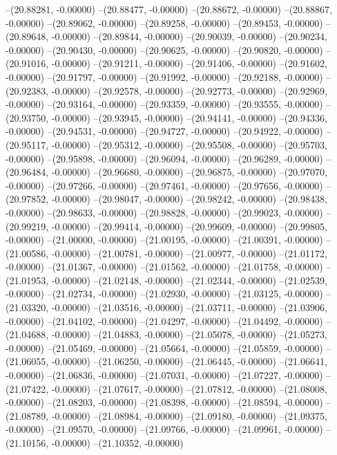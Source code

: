 --(20.88281, -0.00000)
--(20.88477, -0.00000)
--(20.88672, -0.00000)
--(20.88867, -0.00000)
--(20.89062, -0.00000)
--(20.89258, -0.00000)
--(20.89453, -0.00000)
--(20.89648, -0.00000)
--(20.89844, -0.00000)
--(20.90039, -0.00000)
--(20.90234, -0.00000)
--(20.90430, -0.00000)
--(20.90625, -0.00000)
--(20.90820, -0.00000)
--(20.91016, -0.00000)
--(20.91211, -0.00000)
--(20.91406, -0.00000)
--(20.91602, -0.00000)
--(20.91797, -0.00000)
--(20.91992, -0.00000)
--(20.92188, -0.00000)
--(20.92383, -0.00000)
--(20.92578, -0.00000)
--(20.92773, -0.00000)
--(20.92969, -0.00000)
--(20.93164, -0.00000)
--(20.93359, -0.00000)
--(20.93555, -0.00000)
--(20.93750, -0.00000)
--(20.93945, -0.00000)
--(20.94141, -0.00000)
--(20.94336, -0.00000)
--(20.94531, -0.00000)
--(20.94727, -0.00000)
--(20.94922, -0.00000)
--(20.95117, -0.00000)
--(20.95312, -0.00000)
--(20.95508, -0.00000)
--(20.95703, -0.00000)
--(20.95898, -0.00000)
--(20.96094, -0.00000)
--(20.96289, -0.00000)
--(20.96484, -0.00000)
--(20.96680, -0.00000)
--(20.96875, -0.00000)
--(20.97070, -0.00000)
--(20.97266, -0.00000)
--(20.97461, -0.00000)
--(20.97656, -0.00000)
--(20.97852, -0.00000)
--(20.98047, -0.00000)
--(20.98242, -0.00000)
--(20.98438, -0.00000)
--(20.98633, -0.00000)
--(20.98828, -0.00000)
--(20.99023, -0.00000)
--(20.99219, -0.00000)
--(20.99414, -0.00000)
--(20.99609, -0.00000)
--(20.99805, -0.00000)
--(21.00000, -0.00000)
--(21.00195, -0.00000)
--(21.00391, -0.00000)
--(21.00586, -0.00000)
--(21.00781, -0.00000)
--(21.00977, -0.00000)
--(21.01172, -0.00000)
--(21.01367, -0.00000)
--(21.01562, -0.00000)
--(21.01758, -0.00000)
--(21.01953, -0.00000)
--(21.02148, -0.00000)
--(21.02344, -0.00000)
--(21.02539, -0.00000)
--(21.02734, -0.00000)
--(21.02930, -0.00000)
--(21.03125, -0.00000)
--(21.03320, -0.00000)
--(21.03516, -0.00000)
--(21.03711, -0.00000)
--(21.03906, -0.00000)
--(21.04102, -0.00000)
--(21.04297, -0.00000)
--(21.04492, -0.00000)
--(21.04688, -0.00000)
--(21.04883, -0.00000)
--(21.05078, -0.00000)
--(21.05273, -0.00000)
--(21.05469, -0.00000)
--(21.05664, -0.00000)
--(21.05859, -0.00000)
--(21.06055, -0.00000)
--(21.06250, -0.00000)
--(21.06445, -0.00000)
--(21.06641, -0.00000)
--(21.06836, -0.00000)
--(21.07031, -0.00000)
--(21.07227, -0.00000)
--(21.07422, -0.00000)
--(21.07617, -0.00000)
--(21.07812, -0.00000)
--(21.08008, -0.00000)
--(21.08203, -0.00000)
--(21.08398, -0.00000)
--(21.08594, -0.00000)
--(21.08789, -0.00000)
--(21.08984, -0.00000)
--(21.09180, -0.00000)
--(21.09375, -0.00000)
--(21.09570, -0.00000)
--(21.09766, -0.00000)
--(21.09961, -0.00000)
--(21.10156, -0.00000)
--(21.10352, -0.00000)

